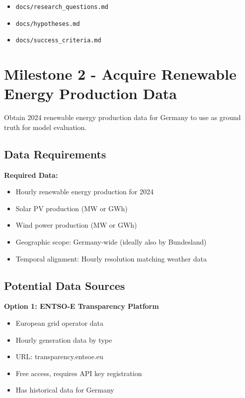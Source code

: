 \documentclass[11pt,a4paper]{article}
\begin{document}
\begin{deliverablebox}
\begin{itemize}
    \item \texttt{docs/research\_questions.md}
    \item \texttt{docs/hypotheses.md}
    \item \texttt{docs/success\_criteria.md}
\end{itemize}
\end{deliverablebox}

\section{Milestone 2 - Acquire Renewable Energy Production Data}

\begin{objectivebox}
Obtain 2024 renewable energy production data for Germany to use as ground truth for model evaluation.
\end{objectivebox}

\subsection{Data Requirements}

\textbf{Required Data:}
\begin{itemize}
    \item Hourly renewable energy production for 2024
    \item Solar PV production (MW or GWh)
    \item Wind power production (MW or GWh)
    \item Geographic scope: Germany-wide (ideally also by Bundesland)
    \item Temporal alignment: Hourly resolution matching weather data
\end{itemize}

\subsection{Potential Data Sources}

\textbf{Option 1: ENTSO-E Transparency Platform}
\begin{itemize}
    \item European grid operator data
    \item Hourly generation data by type
    \item URL: transparency.entsoe.eu
    \item Free access, requires API key registration
    \item Has historical data for Germany
\end{itemize}
\end{document}
